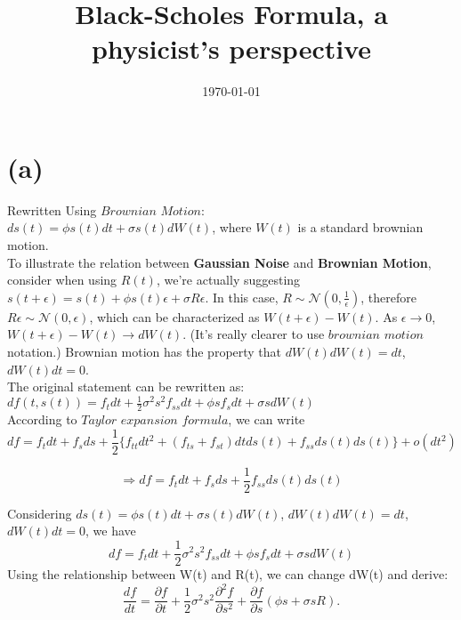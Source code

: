 \documentclass[12pt,a4paper]{paper}
\title{Black-Scholes Formula, a physicist's perspective}
\author{}
\date{\today}
\begin{document}
\maketitle

\section{(a)}
Rewritten Using $Brownian$ $Motion$: \\$ds(t) = \phi s(t) dt + \sigma s(t) dW(t)$, where $W(t)$ is a standard brownian motion.\\\indent To illustrate the relation between \textbf{Gaussian Noise} and \textbf{Brownian Motion}, consider when using $R(t)$, we're actually suggesting $s(t + \epsilon) = s(t) + \phi s(t) \epsilon + \sigma R \epsilon$. In this case, $R \sim \mathcal{N}(0, \frac{1}{\epsilon})$, therefore $R \epsilon \sim \mathcal{N}(0, \epsilon)$, which can be characterized as $W(t + \epsilon) - W(t)$. As $\epsilon \rightarrow 0$, $W(t + \epsilon) - W(t) \rightarrow dW(t)$. (It's really clearer to use $brownian$ $motion$ notation.) Brownian motion has the property that $dW(t)dW(t) = dt$, $dW(t) dt = 0$.\\
\indent The original statement can be rewritten as: \\$df(t, s(t)) = f_t dt + \frac{1}{2}\sigma^2s^2f_{ss}dt + \phi s f_s dt + \sigma s dW(t)$\\
\indent According to $Taylor$ $expansion$ $formula$, we can write
\begin{equation} 
df = f_t dt + f_s ds + \frac{1}{2}\{f_{tt} dt^2 + (f_{ts} + f_{st})dt ds(t) + f_{ss} ds(t)ds(t) \} + o(dt^2)
\end{equation} 

\begin{equation}
\Longrightarrow df = f_t dt + f_s ds + \frac{1}{2} f_{ss} ds(t)ds(t)
\end{equation}

\indent Considering $ds(t) = \phi s(t) dt + \sigma s(t) dW(t)$, $dW(t)dW(t) = dt$, $dW(t) dt = 0$, we have 
\begin{equation}
df = f_t dt + \frac{1}{2}\sigma^2s^2f_{ss}dt + \phi s f_s dt + \sigma s dW(t)
\end{equation}
\indent Using the relationship between W(t) and R(t), we can change dW(t) and derive:
\begin{equation}
\frac{df}{dt}=\frac{\partial f}{\partial t}+\frac{1}{2}\sigma ^{2}s^{2}\frac{\partial^2 f}{\partial s^2}+\frac{\partial f}{\partial s}(\phi s+\sigma sR).
\end{equation}
\end{document}
